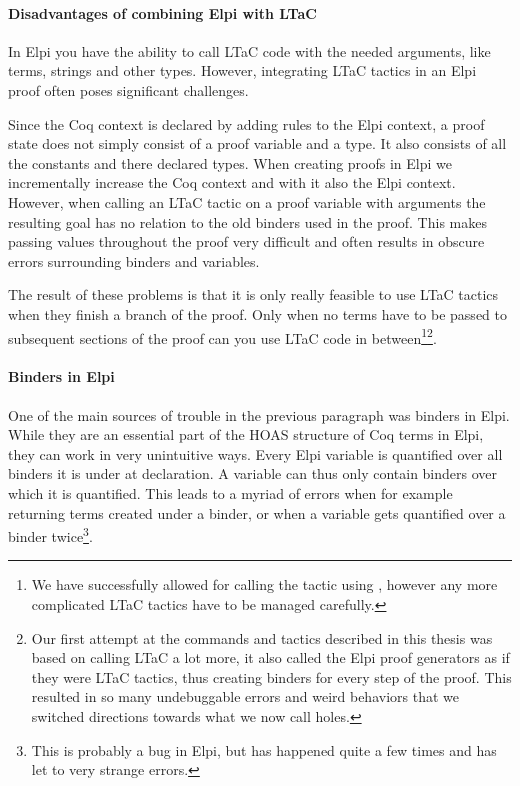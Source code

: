 \documentclass[thesis.tex]{subfiles}
\begin{document}
\paragraph{Disadvantages of combining Elpi with LTaC}
In Elpi you have the ability to call LTaC code with the needed arguments, like terms, strings and other types. However, integrating LTaC tactics in an Elpi proof often poses significant challenges.

Since the Coq context is declared by adding rules to the Elpi context, a proof state does not simply consist of a proof variable and a type. It also consists of all the constants and there declared types. When creating proofs in Elpi we incrementally increase the Coq context and with it also the Elpi context. However, when calling an LTaC tactic on a proof variable with arguments the resulting goal has no relation to the old binders used in the proof. This makes passing values throughout the proof very difficult and often results in obscure errors surrounding binders and variables.

The result of these problems is that it is only really feasible to use LTaC tactics when they finish a branch of the proof. Only when no terms have to be passed to subsequent sections of the proof can you use LTaC code in between\footnote{We have successfully allowed for calling the  tactic using , however any more complicated LTaC tactics have to be managed carefully.}\footnote{Our first attempt at the commands and tactics described in this thesis was based on calling LTaC a lot more, it also called the Elpi proof generators as if they were LTaC tactics, thus creating binders for every step of the proof. This resulted in so many undebuggable errors and weird behaviors that we switched directions towards what we now call holes.}.

\paragraph{Binders in Elpi}
One of the main sources of trouble in the previous paragraph was binders in Elpi. While they are an essential part of the HOAS structure of Coq terms in Elpi, they can work in very unintuitive ways. Every Elpi variable is quantified over all binders it is under at declaration. A variable can thus only contain binders over which it is quantified. This leads to a myriad of errors when for example returning terms created under a binder, or when a variable gets quantified over a binder twice\footnote{This is probably a bug in Elpi, but has happened quite a few times and has let to very strange errors.}.
\end{document}
